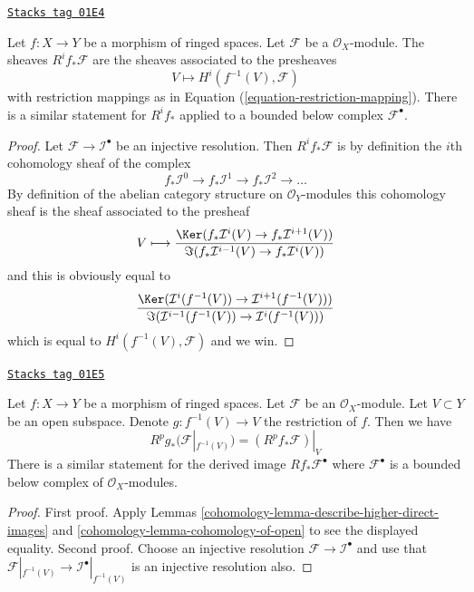 \begin{lemma}
\label{cohomology-lemma-describe-higher-direct-images}
\href{https://stacks.math.columbia.edu/tag/01E4}{\texttt{Stacks tag 01E4}}

Let $f : X \to Y$ be a morphism of ringed spaces.
Let $\mathcal{F}$ be a $\mathcal{O}_X$-module.
The sheaves $R^if_*\mathcal{F}$ are the sheaves
associated to the presheaves
$$
V \longmapsto H^i(f^{-1}(V), \mathcal{F})
$$
with restriction mappings as in Equation (\ref{equation-restriction-mapping}).
There is a similar statement for $R^if_*$ applied to a
bounded below complex $\mathcal{F}^\bullet$.
\end{lemma}

\begin{proof}
Let $\mathcal{F} \to \mathcal{I}^\bullet$ be an injective resolution.
Then $R^if_*\mathcal{F}$ is by definition the $i$th cohomology sheaf
of the complex
$$
f_*\mathcal{I}^0 \to f_*\mathcal{I}^1 \to f_*\mathcal{I}^2 \to \ldots
$$
By definition of the abelian category structure on $\mathcal{O}_Y$-modules
this cohomology sheaf is the sheaf associated to the presheaf
$$
V
\longmapsto
\frac{\Ker(f_*\mathcal{I}^i(V) \to f_*\mathcal{I}^{i + 1}(V))}
{\Im(f_*\mathcal{I}^{i - 1}(V) \to f_*\mathcal{I}^i(V))}
$$
and this is obviously equal to
$$
\frac{\Ker(\mathcal{I}^i(f^{-1}(V)) \to \mathcal{I}^{i + 1}(f^{-1}(V)))}
{\Im(\mathcal{I}^{i - 1}(f^{-1}(V)) \to \mathcal{I}^i(f^{-1}(V)))}
$$
which is equal to $H^i(f^{-1}(V), \mathcal{F})$
and we win.
\end{proof}

\begin{lemma}
\label{cohomology-lemma-localize-higher-direct-images}
\href{https://stacks.math.columbia.edu/tag/01E5}{\texttt{Stacks tag 01E5}}

Let $f : X \to Y$ be a morphism of ringed spaces.
Let $\mathcal{F}$ be an $\mathcal{O}_X$-module.
Let $V \subset Y$ be an open subspace.
Denote $g : f^{-1}(V) \to V$ the restriction of $f$.
Then we have
$$
R^pg_*(\mathcal{F}|_{f^{-1}(V)}) = (R^pf_*\mathcal{F})|_V
$$
There is a similar statement for the
derived image $Rf_*\mathcal{F}^\bullet$ where $\mathcal{F}^\bullet$
is a bounded below complex of $\mathcal{O}_X$-modules.
\end{lemma}

\begin{proof}

First proof. Apply Lemmas \ref{cohomology-lemma-describe-higher-direct-images}
and \ref{cohomology-lemma-cohomology-of-open} to see the displayed equality.
Second proof. Choose an injective resolution
$\mathcal{F} \to \mathcal{I}^\bullet$
and use that $\mathcal{F}|_{f^{-1}(V)} \to \mathcal{I}^\bullet|_{f^{-1}(V)}$
is an injective resolution also.
\end{proof}

